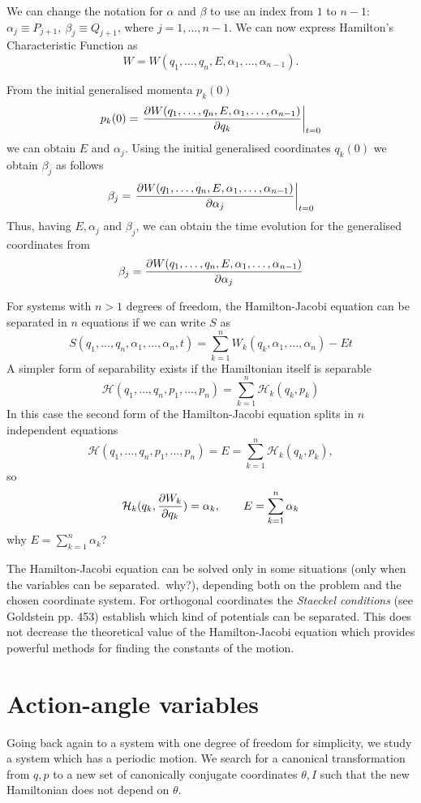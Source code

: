 \documentclass[../thesis.tex]{subfiles}
\theoremstyle{plain}
\begin{document}
We can change the notation for \(\alpha \) and \(\beta \) to use an index from \(1\) to \(n-1\):
\(\alpha_j \equiv P_{j+1},\ \beta_j \equiv Q_{j+1}\), where \(j=1,\dotsc,n-1\).
We can now express Hamilton's Characteristic Function as
\[
  W=W(q_1,\dotsc,q_n,E,\alpha_1,\dotsc,\alpha_{n-1}).
\]

From the initial generalised momenta \(p_k(0)\)
\[
  p_k(0) = \eval{\pdv{W(q_1,\dotsc,q_n,E,\alpha_1,\dotsc,\alpha_{n-1})}{q_k}}_{t=0}
\]
we can obtain \(E\) and \(\alpha_j\). Using the initial generalised coordinates \(q_k(0)\)
we obtain \(\beta_j\) as follows
\[
  \beta_j = \eval{\pdv{W(q_1,\dotsc,q_n,E,\alpha_1,\dotsc,\alpha_{n-1})}{\alpha_j}}_{t=0}
\]
Thus, having \(E, \alpha_j\) and \(\beta_j\), we can obtain the time evolution
for the generalised coordinates from
\[
  \beta_j = \pdv{W(q_1,\dotsc,q_n,E,\alpha_1,\dotsc,\alpha_{n-1})}{\alpha_j}
\]

For systems with \(n>1\) degrees of freedom, the Hamilton-Jacobi equation can be separated in
\(n\) equations if we can write \(S\) as
\[
  S(q_1,\dotsc,q_n,\alpha_1,\dotsc,\alpha_n,t) = \sum_{k=1}^n W_k(q_k,\alpha_1,\dotsc,\alpha_n)-Et
\]
A simpler form of separability exists if the Hamiltonian itself is separable
\[
  \mathcal{H}(q_1,\dotsc,q_n,p_1,\dotsc,p_n) = \sum_{k=1}^n \mathcal{H}_k(q_k,p_k)
\]
In this case the second form of the Hamilton-Jacobi equation splits in \(n\) independent equations
\[
  \mathcal{H}(q_1,\dotsc,q_n,p_1,\dotsc,p_n) = E = \sum_{k=1}^n \mathcal{H}_k(q_k,p_k),
\]
so
\[
  \mathcal{H}_k(q_k,\pdv{W_k}{q_k}) = \alpha_k,\qquad E = \sum_{k=1}^n \alpha_k
\]
{\color{red}why \(E = \sum_{k=1}^n \alpha_k\)?}

The Hamilton-Jacobi equation can be solved only in some situations
({\color{red}only when the variables can be separated.\ why?}), depending both on the problem
and the chosen coordinate system. For orthogonal coordinates the \emph{Staeckel conditions}
(see Goldstein pp. 453) establish which kind of potentials can be separated.
This does not decrease the theoretical value of the Hamilton-Jacobi equation which provides
powerful methods for finding the constants of the motion.

\section{Action-angle variables}

Going back again to a system with one degree of freedom for simplicity, we study a system
which has a periodic motion. We search for a canonical transformation from \(q,p\) to
a new set of canonically conjugate coordinates \(\theta, I\) such that the new
Hamiltonian does not depend on \(\theta \).
\end{document}
